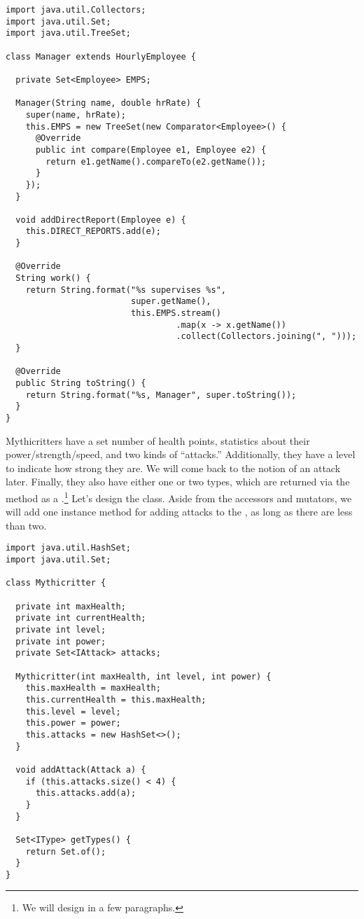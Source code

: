 \begin{lstlisting}[language=MyJava]
import java.util.Collectors;
import java.util.Set;
import java.util.TreeSet;

class Manager extends HourlyEmployee {

  private Set<Employee> EMPS;

  Manager(String name, double hrRate) {
    super(name, hrRate);
    this.EMPS = new TreeSet(new Comparator<Employee>() {
      @Override
      public int compare(Employee e1, Employee e2) {
        return e1.getName().compareTo(e2.getName());
      }
    });
  }

  void addDirectReport(Employee e) {
    this.DIRECT_REPORTS.add(e);
  }

  @Override
  String work() {
    return String.format("%s supervises %s", 
                         super.getName(),
                         this.EMPS.stream()
                                  .map(x -> x.getName())
                                  .collect(Collectors.joining(", ")));
  }

  @Override
  public String toString() {
    return String.format("%s, Manager", super.toString());
  }
}
\end{lstlisting}


Mythicritters have a set number of health points, statistics about their power/strength/speed, and two kinds of ``attacks.'' 
Additionally, they have a level to indicate how strong they are. 
We will come back to the notion of an attack later. 
Finally, they also have either one or two types, which are returned via the  method as a .\footnote{We will design  in a few paragraphs.} 
Let's design the  class. Aside from the accessors and mutators, we will add one instance method for adding attacks to the , as long as there are less than two. 

\begin{lstlisting}[language=MyJava]
import java.util.HashSet;
import java.util.Set; 

class Mythicritter {
  
  private int maxHealth;
  private int currentHealth;
  private int level;
  private int power;
  private Set<IAttack> attacks;

  Mythicritter(int maxHealth, int level, int power) {
    this.maxHealth = maxHealth;
    this.currentHealth = this.maxHealth;
    this.level = level;
    this.power = power;
    this.attacks = new HashSet<>();
  }

  void addAttack(Attack a) { 
    if (this.attacks.size() < 4) {
      this.attacks.add(a);
    }
  }

  Set<IType> getTypes() {
    return Set.of();
  }
}
\end{lstlisting}

